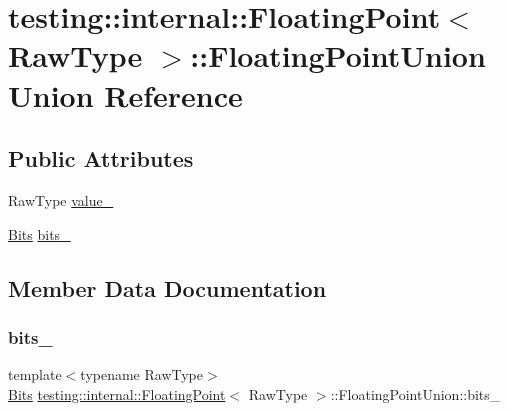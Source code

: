 \hypertarget{uniontesting_1_1internal_1_1_floating_point_1_1_floating_point_union}{}\section{testing\+::internal\+::Floating\+Point$<$ Raw\+Type $>$\+::Floating\+Point\+Union Union Reference}
\label{uniontesting_1_1internal_1_1_floating_point_1_1_floating_point_union}
\subsection*{Public Attributes}
\begin{DoxyCompactItemize}
\item 
Raw\+Type \mbox{\hyperlink{uniontesting_1_1internal_1_1_floating_point_1_1_floating_point_union_a4ee324889f70577721393e8e1920e4c6}{value\+\_\+}}
\item 
\mbox{\hyperlink{classtesting_1_1internal_1_1_floating_point_abf228bf6cd48f12c8b44c85b4971a731}{Bits}} \mbox{\hyperlink{uniontesting_1_1internal_1_1_floating_point_1_1_floating_point_union_aedb69e386f5d624a016f7a781302a2bf}{bits\+\_\+}}
\end{DoxyCompactItemize}


\subsection{Member Data Documentation}
\mbox{\label{uniontesting_1_1internal_1_1_floating_point_1_1_floating_point_union_aedb69e386f5d624a016f7a781302a2bf}} 
\subsubsection{\texorpdfstring{bits\_}{bits\_}}
{\footnotesize\ttfamily template$<$typename Raw\+Type$>$ \\
\mbox{\hyperlink{classtesting_1_1internal_1_1_floating_point_abf228bf6cd48f12c8b44c85b4971a731}{Bits}} \mbox{\hyperlink{classtesting_1_1internal_1_1_floating_point}{testing\+::internal\+::\+Floating\+Point}}$<$ Raw\+Type $>$\+::Floating\+Point\+Union\+::bits\+\_\+}

